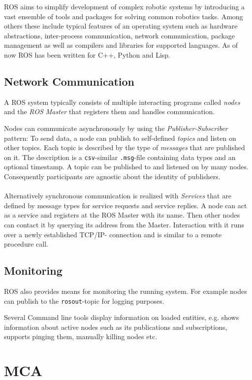 ROS aims to simplify development of complex robotic systems by introducing a vast ensemble of tools and packages for solving common robotics tasks. Among others these include typical features of an operating system such as hardware abstractions, inter-process communication, network communication, package management as well as compilers and libraries for supported languages. As of now ROS has been written for C++, Python and Lisp.

\subsection{Network Communication}
A ROS system typically consists of multiple interacting programs called \textit{nodes} and the \textit{ROS Master} that registers them and handles communication.

Nodes can communicate asynchronously by using the \textit{Publisher-Subscriber} pattern: To send data, a node can publish to self-defined \textit{topics} and listen on other topics. Each topic is described by the type of \textit{messages} that are published on it. The description is a \texttt{csv}-similar \texttt{.msg}-file containing data types and an optional timestamp.
A topic can be published to and listened on by many nodes. Consequently participants are agnostic about the identity of publishers.
\\\\
Alternatively synchronous communication is realized with \textit{Services} that are defined by message types for service requests and service replies. A node can act as a service and registers at the ROS Master with its name. Then other nodes can contact it by querying its address from the Master. Interaction with it runs over a newly established TCP/IP- connection and is similar to a remote procedure call.

\subsection{Monitoring}
ROS also provides means for monitoring the running system. For example nodes can publish to the \texttt{rosout}-topic for logging purposes.

Several Command line tools display information on loaded entities, e.g.  shows information about active nodes such as its publications and subscriptions, supports pinging them, manually killing nodes etc. 

\section{MCA}

